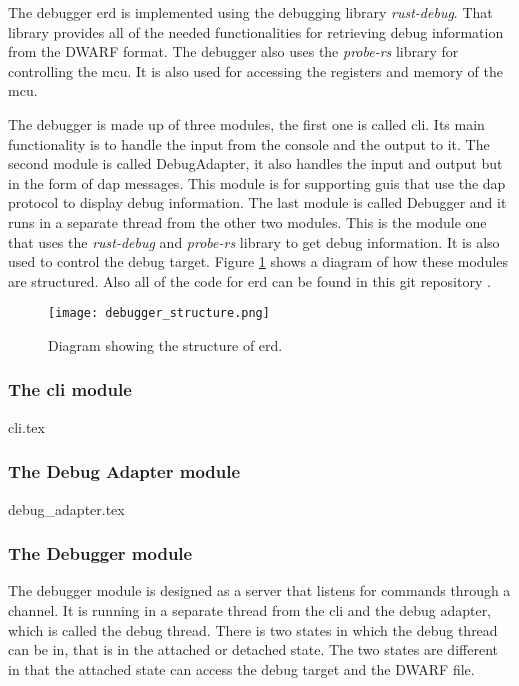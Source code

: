 The debugger \acrfull{erd} is implemented using the debugging library \emph{rust-debug}.
That library provides all of the needed functionalities for retrieving debug information from the \gls{DWARF} format.
The debugger also uses the \emph{probe-rs} library for controlling the \gls{mcu}.
It is also used for accessing the registers and memory of the \gls{mcu}.


The debugger is made up of three modules, the first one is called \acrshort{cli}.
Its main functionality is to handle the input from the console and the output to it.
The second module is called DebugAdapter, it also handles the input and output but in the form of \gls{dap} messages.
This module is for supporting \glspl{gui} that use the \gls{dap} protocol to display debug information.
The last module is called Debugger and it runs in a separate thread from the other two modules.
This is the module one that uses the \emph{rust-debug} and \emph{probe-rs} library to get debug information.
It is also used to control the debug target.
Figure \ref{fig:ERDStruct} shows a diagram of how these modules are structured.
Also all of the code for \gls{erd} can be found in this git repository \cite{erd}.


\begin{figure}[h]
	\centering
	\texttt{[image: debugger\_structure.png]}
	\caption{Diagram showing the structure of  \acrfull{erd}.}
	\label{fig:ERDStruct}
\end{figure}


\subsubsection{The \acrshort{cli} module}
{cli.tex}


\subsubsection{The Debug Adapter module}
{debug_adapter.tex}


\subsubsection{The Debugger module}
The debugger module is designed as a server that listens for commands through a channel.
It is running in a separate thread from the \acrshort{cli} and the debug adapter, which is called the debug thread.
There is two states in which the debug thread can be in, that is in the attached or detached state.
The two states are different in that the attached state can access the debug target and the \gls{DWARF} file.


